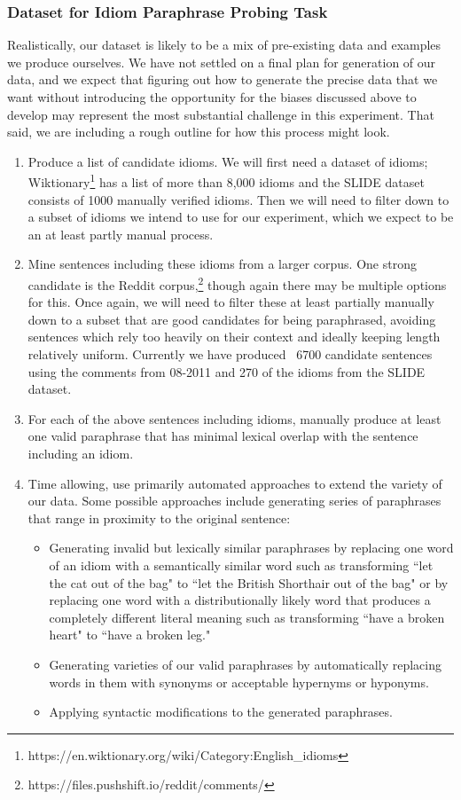 \documentclass[11pt,a4paper]{article}
\begin{document}
\subsubsection{Dataset for Idiom Paraphrase Probing Task}
Realistically, our dataset is likely to be a mix of pre-existing data and examples we produce ourselves. We have not settled on a final plan for generation of our data, and we expect that figuring out how to generate the precise data that we want without introducing the opportunity for the biases discussed above to develop may represent the most substantial challenge in this experiment. That said, we are including a rough outline for how this process might look. 
\begin{enumerate}
    \item Produce a list of candidate idioms. We will first need a dataset of idioms; Wiktionary\footnote{https://en.wiktionary.org/wiki/Category:English\_idioms} has a list of more than 8,000 idioms and the SLIDE dataset \cite{Jochim2018SLIDEA} consists of 1000 manually verified idioms. Then we will need to filter down to a subset of idioms we intend to use for our experiment, which we expect to be an at least partly manual process.
    \item Mine sentences including these idioms from a larger corpus. One strong candidate is the Reddit corpus,\footnote{https://files.pushshift.io/reddit/comments/} though again there may be multiple options for this. Once again, we will need to filter these at least partially manually down to a subset that are good candidates for being paraphrased, avoiding sentences which rely too heavily on their context and ideally keeping length relatively uniform. Currently we have produced ~6700 candidate sentences using the comments from 08-2011 and 270 of the idioms from the SLIDE dataset.
    \item For each of the above sentences including idioms, manually produce at least one valid paraphrase that has minimal lexical overlap with the sentence including an idiom. 
    \item Time allowing, use primarily automated approaches to extend the variety of our data. Some possible approaches include generating series of paraphrases that range in proximity to the original sentence:
    \begin{itemize}
        \item Generating invalid but lexically similar paraphrases by replacing one word of an idiom  with a semantically similar word such as transforming ``let the cat out of the bag" to ``let the British Shorthair out of the bag" or by replacing one word with a distributionally likely word that produces a completely different literal meaning such as transforming ``have a broken heart" to ``have a broken leg."
        \item Generating varieties of our valid paraphrases by automatically replacing words in them with synonyms or acceptable hypernyms or hyponyms.
        \item Applying syntactic modifications to the generated paraphrases.
    \end{itemize}
\end{enumerate}
\end{document}
